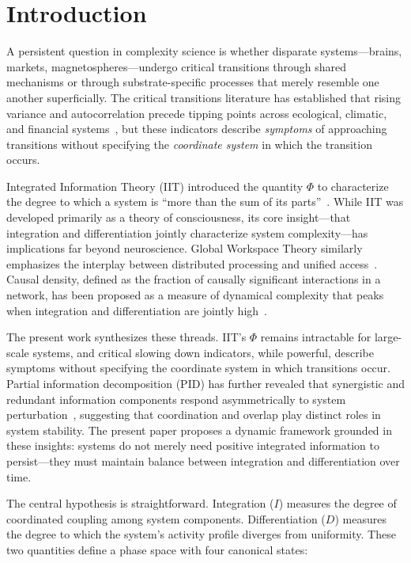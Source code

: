\documentclass[aip,cha,reprint,amsmath,amssymb]{revtex4-2}
\begin{document}
\section{Introduction}

A persistent question in complexity science is whether disparate systems---brains, markets, magnetospheres---undergo critical transitions through shared mechanisms or through substrate-specific processes that merely resemble one another superficially. The critical transitions literature has established that rising variance and autocorrelation precede tipping points across ecological, climatic, and financial systems~\cite{scheffer2009,dakos2012}, but these indicators describe \emph{symptoms} of approaching transitions without specifying the \emph{coordinate system} in which the transition occurs.

Integrated Information Theory (IIT) introduced the quantity $\Phi$ to characterize the degree to which a system is ``more than the sum of its parts''~\cite{tononi2016,tononi2004}. While IIT was developed primarily as a theory of consciousness, its core insight---that integration and differentiation jointly characterize system complexity---has implications far beyond neuroscience. Global Workspace Theory similarly emphasizes the interplay between distributed processing and unified access~\cite{baars1988}. Causal density, defined as the fraction of causally significant interactions in a network, has been proposed as a measure of dynamical complexity that peaks when integration and differentiation are jointly high~\cite{seth2011}.

The present work synthesizes these threads. IIT's $\Phi$ remains intractable for large-scale systems, and critical slowing down indicators, while powerful, describe symptoms without specifying the coordinate system in which transitions occur. Partial information decomposition (PID) has further revealed that synergistic and redundant information components respond asymmetrically to system perturbation~\cite{williams2010,popiel2020}, suggesting that coordination and overlap play distinct roles in system stability. The present paper proposes a dynamic framework grounded in these insights: systems do not merely need positive integrated information to persist---they must maintain balance between integration and differentiation over time.

The central hypothesis is straightforward. Integration ($I$) measures the degree of coordinated coupling among system components. Differentiation ($D$) measures the degree to which the system's activity profile diverges from uniformity. These two quantities define a phase space with four canonical states:
\end{document}
